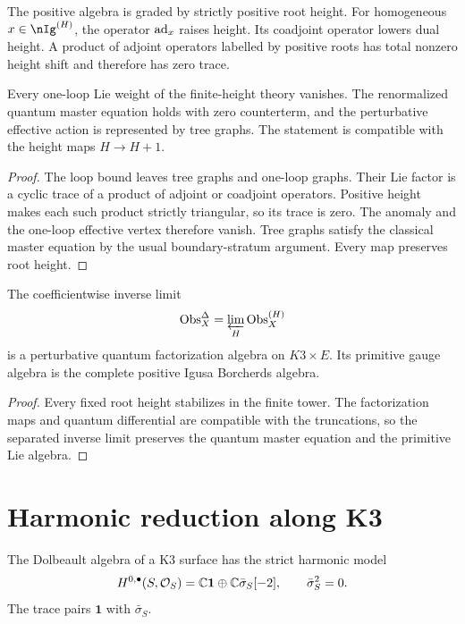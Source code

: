The positive algebra is graded by strictly positive root height.  For homogeneous $x\in\nIg^{(H)}$, the operator $\operatorname{ad}_x$ raises height.  Its coadjoint operator lowers dual height.  A product of adjoint operators labelled by positive roots has total nonzero height shift and therefore has zero trace.

\begin{theorem}
Every one-loop Lie weight of the finite-height theory vanishes.  The renormalized quantum master equation holds with zero counterterm, and the perturbative effective action is represented by tree graphs.  The statement is compatible with the height maps $H\to H+1$.
\end{theorem}
\begin{proof}
The loop bound leaves tree graphs and one-loop graphs.  Their Lie factor is a cyclic trace of a product of adjoint or coadjoint operators.  Positive height makes each such product strictly triangular, so its trace is zero.  The anomaly and the one-loop effective vertex therefore vanish.  Tree graphs satisfy the classical master equation by the usual boundary-stratum argument.  Every map preserves root height.
\end{proof}

\begin{corollary}
The coefficientwise inverse limit
\[
 \operatorname{Obs}_X^{\Delta}=\varprojlim_H\operatorname{Obs}_X^{(H)}
\]
is a perturbative quantum factorization algebra on $K3\times E$.  Its primitive gauge algebra is the complete positive Igusa Borcherds algebra.
\end{corollary}
\begin{proof}
Every fixed root height stabilizes in the finite tower.  The factorization maps and quantum differential are compatible with the truncations, so the separated inverse limit preserves the quantum master equation and the primitive Lie algebra.
\end{proof}

\chapter{Harmonic reduction along K3}
The Dolbeault algebra of a K3 surface has the strict harmonic model
\[
 H^{0,\bullet}(S,\mathcal O_S)
 =\mathbb C\mathbf1\oplus\mathbb C\bar\sigma_S[-2],
 \qquad
 \bar\sigma_S^2=0.
\]
The trace pairs $\mathbf1$ with $\bar\sigma_S$.

